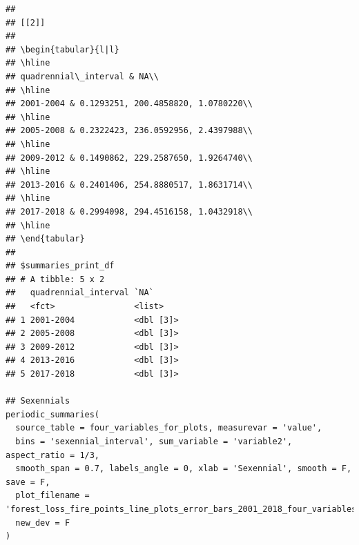\documentclass[10pt,landscape,a3paper]{article}
\begin{document}
\begin{verbatim}
## 
## [[2]]
## 
## \begin{tabular}{l|l}
## \hline
## quadrennial\_interval & NA\\
## \hline
## 2001-2004 & 0.1293251, 200.4858820, 1.0780220\\
## \hline
## 2005-2008 & 0.2322423, 236.0592956, 2.4397988\\
## \hline
## 2009-2012 & 0.1490862, 229.2587650, 1.9264740\\
## \hline
## 2013-2016 & 0.2401406, 254.8880517, 1.8631714\\
## \hline
## 2017-2018 & 0.2994098, 294.4516158, 1.0432918\\
## \hline
## \end{tabular}
## 
## $summaries_print_df
## # A tibble: 5 x 2
##   quadrennial_interval `NA`     
##   <fct>                <list>   
## 1 2001-2004            <dbl [3]>
## 2 2005-2008            <dbl [3]>
## 3 2009-2012            <dbl [3]>
## 4 2013-2016            <dbl [3]>
## 5 2017-2018            <dbl [3]>

## Sexennials
periodic_summaries(
  source_table = four_variables_for_plots, measurevar = 'value',
  bins = 'sexennial_interval', sum_variable = 'variable2', aspect_ratio = 1/3,
  smooth_span = 0.7, labels_angle = 0, xlab = 'Sexennial', smooth = F, save = F,
  plot_filename = 'forest_loss_fire_points_line_plots_error_bars_2001_2018_four_variables_sexennial.jpg',
  new_dev = F
)
\end{verbatim}
\end{document}
